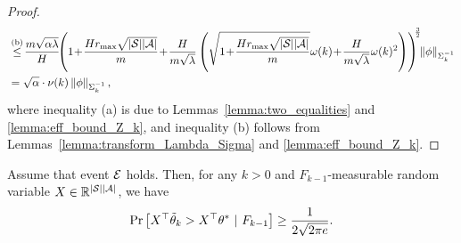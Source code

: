 \begin{proof}
\begin{align*}
		&\overset{\textup{(b)}}{\leq} \!\frac{m \sqrt{\alpha \lambda}}{H} \!\! \sbr{ 1 \!+\!  \frac{H r_{\max} \sqrt{|\cS| |\cA|}}{m}   \!+\! \frac{H}{m\sqrt{\lambda}} \sbr{ \sqrt{ 1 \!+\!  \frac{H r_{\max} \sqrt{|\cS| |\cA|}}{m} } \omega(k) \!+\! \frac{H}{m\sqrt{\lambda}} \omega(k)^2 } }^{\!\!\frac{3}{2}} \!\!\nbr{\phi}_{\Sigma_k^{-1}} 
		\\
		&= \sqrt{\alpha} \cdot \nu(k) \nbr{\phi}_{\Sigma_k^{-1}} ,
	\end{align*}
	where inequality (a) is due to Lemmas~\ref{lemma:two_equalities} and \ref{lemma:eff_bound_Z_k}, and inequality (b) follows from  Lemmas~\ref{lemma:transform_Lambda_Sigma} and \ref{lemma:eff_bound_Z_k}.
\end{proof}

\begin{lemma} \label{lemma:Gaussian_anti_concentration}
	Assume that event $\mathcal{E}$ holds. Then, for any $k>0$ and $F_{k-1}$-measurable random variable $X \in \mathbb{R}^{|\mathcal{S}| |\mathcal{A}|}$, we have
	\begin{align*}
		\Pr\mbr{ X^\top \tilde{\theta}_k > X^\top \theta^* \ |\ F_{k-1} } \geq \frac{1}{2\sqrt{2\pi e}} .
	\end{align*}
\end{lemma}
